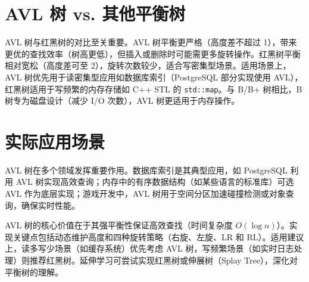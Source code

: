 \chapter{AVL 树 vs. 其他平衡树}
AVL 树与红黑树的对比至关重要。AVL 树平衡更严格（高度差不超过 1），带来更优的查找效率（树高更低），但插入或删除时可能需更多旋转操作。红黑树平衡相对宽松（高度差可至 2），旋转次数较少，适合写密集型场景。适用场景上，AVL 树优先用于读密集型应用如数据库索引（PostgreSQL 部分实现使用 AVL），红黑树适用于写频繁的内存存储如 C++ STL 的 \texttt{std::map}。与 B/B+ 树相比，B 树专为磁盘设计（减少 I/O 次数），AVL 树更适用于内存操作。\par
\chapter{实际应用场景}
AVL 树在多个领域发挥重要作用。数据库索引是其典型应用，如 PostgreSQL 利用 AVL 树实现高效查询；内存中的有序数据结构（如某些语言的标准库）可选 AVL 作为底层实现；游戏开发中，AVL 树用于空间分区加速碰撞检测或对象查询，确保实时性能。\par
AVL 树的核心价值在于其强平衡性保证高效查找（时间复杂度 $O(\log n)$）。实现关键点包括动态维护高度和四种旋转策略（右旋、左旋、LR 和 RL）。适用建议上，读多写少场景（如缓存系统）优先考虑 AVL 树，写频繁场景（如实时日志处理）则推荐红黑树。延伸学习可尝试实现红黑树或伸展树（Splay Tree），深化对平衡树的理解。\par
